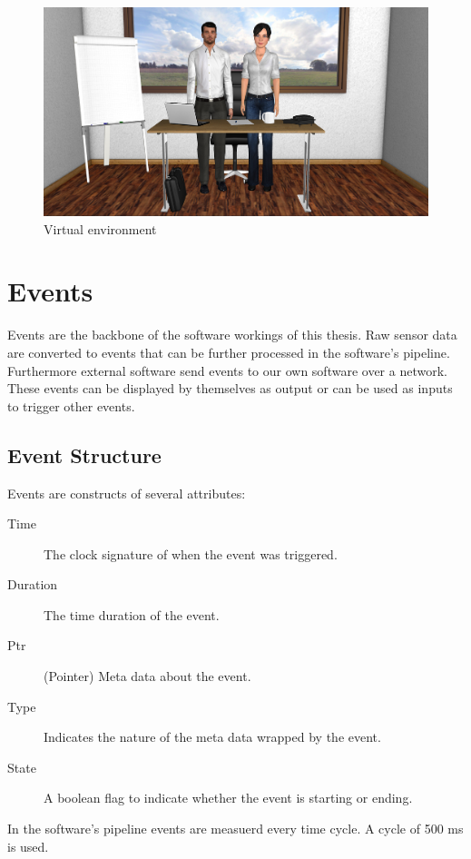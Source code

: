 \documentclass[12pt, a4paper, fleqn]{memoir}%
\begin{document}
\begin{figure}[h!]
    \centering
    \includegraphics[width=1\textwidth]{agents}
    \caption{Virtual environment}
    \label{fig:agents_img}
\end{figure}

\chapter{Events}
\label{chap:Events}
Events are the backbone of the software workings of this thesis. Raw sensor data are converted to events that can be further processed in the software's pipeline. Furthermore external software send events to our own software over a network. These events can be displayed by themselves as output or can be used as inputs to trigger other events.

\section{Event Structure}
Events are constructs of several attributes:

\begin{description}
  \item[Time] The clock signature of when the event was triggered.
  \item[Duration] The time duration of the event.
  \item[Ptr] (Pointer) Meta data about the event.
  \item[Type] Indicates the nature of the meta data wrapped by the event.
  \item[State] A boolean flag to indicate whether the event is starting or ending.
\end{description}

In the software's pipeline events are measuerd every time cycle. A cycle of 500 ms is used.
\end{document}
